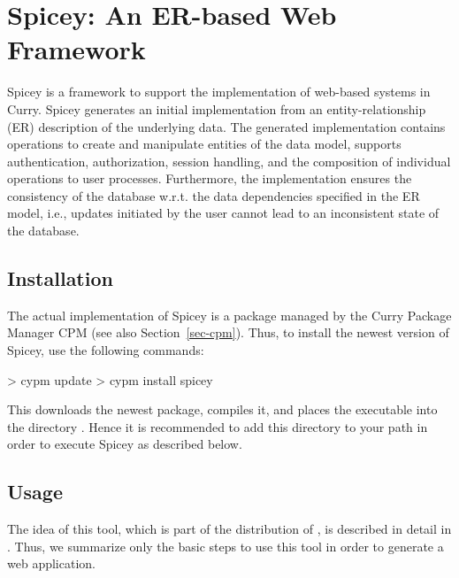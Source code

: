 \section{Spicey: An ER-based Web Framework}
\label{sec-spicey}

Spicey is a framework to support the implementation of
web-based systems in Curry. Spicey generates an initial implementation
from an entity-relationship (ER) description of the underlying
data. The generated implementation contains operations to create and
manipulate entities of the data model, supports authentication,
authorization, session handling, and the composition of individual
operations to user processes. Furthermore, the implementation ensures
the consistency of the database w.r.t. the data dependencies specified
in the ER model, i.e., updates initiated by the user cannot lead to an
inconsistent state of the database.

\subsection{Installation}

The actual implementation of Spicey is a package
managed by the Curry Package Manager CPM
(see also Section~\ref{sec-cpm}).
Thus, to install the newest version of Spicey, use the following commands:
%
\begin{curry}
> cypm update
> cypm install spicey
\end{curry}
%
This downloads the newest package, compiles it, and places
the executable  into the directory .
Hence it is recommended to add this directory to your path
in order to execute Spicey as described below.

\subsection{Usage}

The idea of this tool, which is part of the distribution of \CYS,
is described in detail in \cite{HanusKoschnicke14TPLP}.
Thus, we summarize only the basic steps to use this tool
in order to generate a web application.

